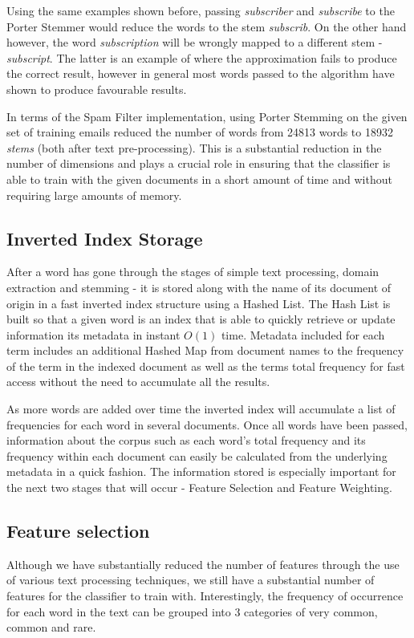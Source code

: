 Using the same examples shown before, passing \emph{subscriber} and \emph{subscribe} to the Porter Stemmer would reduce the words to the stem \emph{subscrib}. On the other hand however, the word \emph{subscription} will be wrongly mapped to a different stem - \emph{subscript}. The latter is an example of where the approximation fails to produce the correct result, however in general most words passed to the algorithm have shown to produce favourable results.

In terms of the Spam Filter implementation, using Porter Stemming on the given set of training emails reduced the number of words from 24813 words to 18932 \textit{stems} (both after text pre-processing). This is a substantial reduction in the number of dimensions and plays a crucial role in ensuring that the classifier is able to train with the given documents in a short amount of time and without requiring large amounts of memory.

\subsection{Inverted Index Storage}

After a word has gone through the stages of simple text processing, domain extraction and stemming - it is stored along with the name of its document of origin in a fast inverted index structure using a Hashed List. The Hash List is built so that a given word is an index that is able to quickly retrieve or update information its metadata in instant $O(1)$ time. Metadata included for each term includes an additional Hashed Map from document names to the frequency of the term in the indexed document as well as the terms total frequency for fast access without the need to accumulate all the results.

As more words are added over time the inverted index will accumulate a list of frequencies for each word in several documents. Once all words have been passed, information about the corpus such as each word's total frequency and its frequency within each document can easily be calculated from the underlying metadata in a quick fashion. The information stored is especially important for the next two stages that will occur - Feature Selection and Feature Weighting.

\subsection{Feature selection}
Although we have substantially reduced the number of features through the use of various text processing techniques, we still have a substantial number of features for the classifier to train with. Interestingly, the frequency of occurrence for each word in the text can be grouped into 3 categories of very common, common and rare. 

